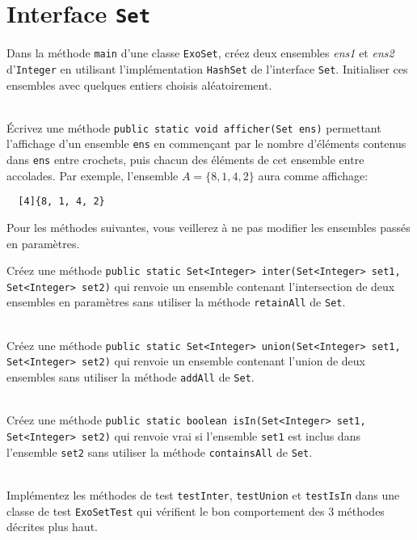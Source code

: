 \documentclass[iutinfo,a4paper,10pt]{ustl-tdtp}
\date{\annee{2018}--\annee{2019}}
\begin{document}

\maketitle
\thispagestyle{empty}

\section{Interface \texttt{Set}}
\sloppy

\question Dans la méthode \texttt{main} d'une classe \texttt{ExoSet}, créez deux ensembles {\it ens1} et {\it ens2} d'\texttt{Integer} en utilisant l'implémentation \texttt{HashSet} de l'interface \texttt{Set}. Initialiser ces ensembles avec quelques entiers choisis aléatoirement.

~\\ \question Écrivez une méthode \texttt{public static void afficher(Set
  ens)} permettant l'affichage d'un ensemble \texttt{ens} en
commençant par le nombre d'éléments contenus dans \texttt{ens} entre
crochets, puis chacun des éléments de cet ensemble entre accolades. Par exemple, l'ensemble $A=\{8,1,4,2\}$ aura comme affichage: 
\begin{verbatim}
  [4]{8, 1, 4, 2}
\end{verbatim}

Pour les méthodes suivantes, vous veillerez à ne pas modifier les ensembles passés en paramètres.

\question Créez une méthode \texttt{public static Set<Integer> inter(Set<Integer> set1, Set<Integer> set2)} qui renvoie un ensemble contenant l'intersection de deux ensembles en paramètres sans utiliser la méthode \texttt{retainAll} de \texttt{Set}.

~\\ \question Créez une méthode \texttt{public static Set<Integer> union(Set<Integer> set1, Set<Integer> set2)} qui renvoie un ensemble contenant l'union de deux ensembles sans utiliser la méthode \texttt{addAll} de \texttt{Set}.

~\\ \question Créez une méthode \texttt{public static boolean
  isIn(Set<Integer> set1, Set<Integer> set2)} qui renvoie vrai si
l'ensemble \texttt{set1} est inclus dans l'ensemble \texttt{set2} sans utiliser la méthode \texttt{containsAll} de \texttt{Set}.

~\\ \question Implémentez les méthodes de test \texttt{testInter}, \texttt{testUnion} et \texttt{testIsIn} dans une classe de test \texttt{ExoSetTest} qui vérifient le bon comportement des 3 méthodes décrites plus haut. 
\end{document}
